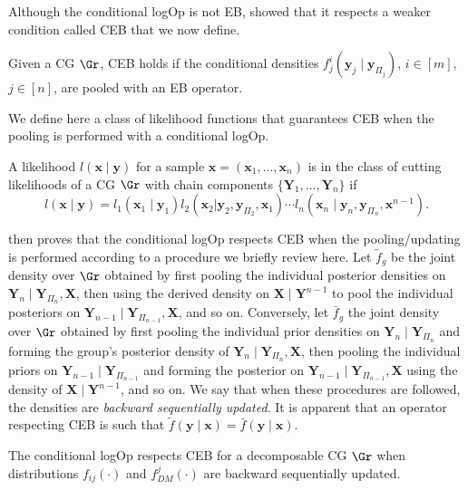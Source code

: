 Although the conditional \gls{logOp} is not \gls{EB}, \citet{Faria1997} showed that it respects a weaker condition called \gls{CEB} that we now define. 

\begin{definition}
Given a \gls{CG} $\Gr$, \gls{CEB} holds if the conditional densities $f_{j}^i(\bm{y}_j\;|\; \bm{y}_{\Pi_j})$, $i\in[m]$, $j\in[n]$, are pooled with an \gls{EB} operator.
\end{definition}

We define here a class of likelihood functions that guarantees \gls{CEB} when the pooling is performed with a conditional \gls{logOp}.

\begin{definition}
\label{def:cutting}
A likelihood $l(\bm{x}\;|\;\bm{y})$ for a sample $\bm{x}=(\bm{x}_1,\dots,\bm{x}_n)$ is in the class of cutting likelihoods of a \gls{CG} $\Gr$ with chain components $\{\bm{Y}_1,\dots,\bm{Y}_n\}$ if
\begin{equation*}
l(\bm{x}\;|\;\bm{y})=l_1(\bm{x}_1\;|\;\bm{y}_1)l_2(\bm{x}_2|\bm{y}_2, \bm{y}_{\Pi_2},\bm{x}_1)\cdots l_n(\bm{x}_n\;|\;\bm{y}_n,\bm{y}_{\Pi_n},\bm{x}^{n-1}).
\end{equation*}
\end{definition} 

\citet{Faria1997} then proves that the conditional \gls{logOp} respects \gls{CEB} when the pooling/updating is performed according to a procedure we briefly review here. Let $\tilde{f}_g$ be the joint density over $\Gr$ obtained by first pooling the individual posterior densities on $\bm{Y}_n\;|\; \bm{Y}_{\Pi_n}, \bm{X}$, then using the derived density on $\bm{X}\;|\; \bm{Y}^{n-1}$ to pool the  individual posteriors on $\bm{Y}_{n-1}\;|\;\bm{Y}_{\Pi_{n-1}},\bm{X}$, and so on. Conversely, let $\bar{f}_g$ the joint density over $\Gr$ obtained by first pooling the individual prior densities on $\bm{Y}_{n}\;|\;\bm{Y}_{\Pi_n}$ and forming the group's posterior density of $\bm{Y}_n\;|\;\bm{Y}_{\Pi_n},\bm{X}$, then pooling the individual priors on $\bm{Y}_{n-1}\;|\;\bm{Y}_{\Pi_{n-1}}$ and forming the posterior on $\bm{Y}_{n-1}\;|\;\bm{Y}_{\Pi_{n-1}},\bm{X}$ using the density of $\bm{X}\;|\;\bm{Y}^{n-1}$, and so on. We say that when these procedures are followed, the densities are \textit{backward sequentially updated}. It is apparent that an operator respecting \gls{CEB} is such that $\tilde{f}(\bm{y}\;|\; \bm{x})=\bar{f}(\bm{y}\;|\;\bm{x})$.

\begin{proposition}
\label{prop:ceb}
The conditional \gls{logOp} respects \gls{CEB} for a decomposable \gls{CG} $\Gr$ when distributions $f_{ij}(\cdot)$ and $f_{DM}^j(\cdot)$ are backward sequentially updated.
\end{proposition}
 
